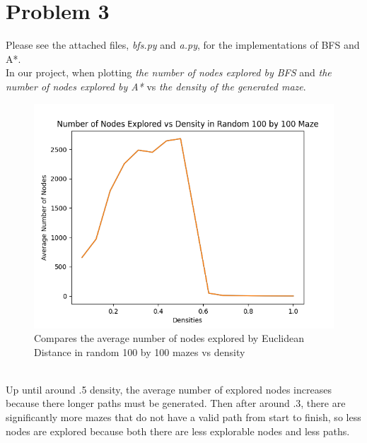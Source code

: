 \documentclass[12pt]{report}
\begin{document}
\section{Problem 3}
Please see the attached files, \emph{bfs.py} and \emph{a.py}, for the implementations of BFS and A*.\\
In our project, when plotting \emph{the number of nodes explored by BFS} and \emph{the number of nodes explored by A*} vs \emph{the density of the generated maze}.\\
\begin{figure}[h]
\includegraphics[width=\textwidth]{Number of Nodes Explored vs Density in Random 100 by 100 Maze.png}
\caption{Compares the average number of nodes explored by Euclidean Distance in random 100 by 100 mazes vs density}
\label{Number of Nodes Explored vs Density}
\end{figure}\\
Up until around .5 density, the average number of explored nodes increases because there longer paths must be generated. Then after around .3, there are significantly more mazes that do not have a valid path from start to finish, so less nodes are explored because both there are less explorable nodes and less paths.

\break
\end{document}
